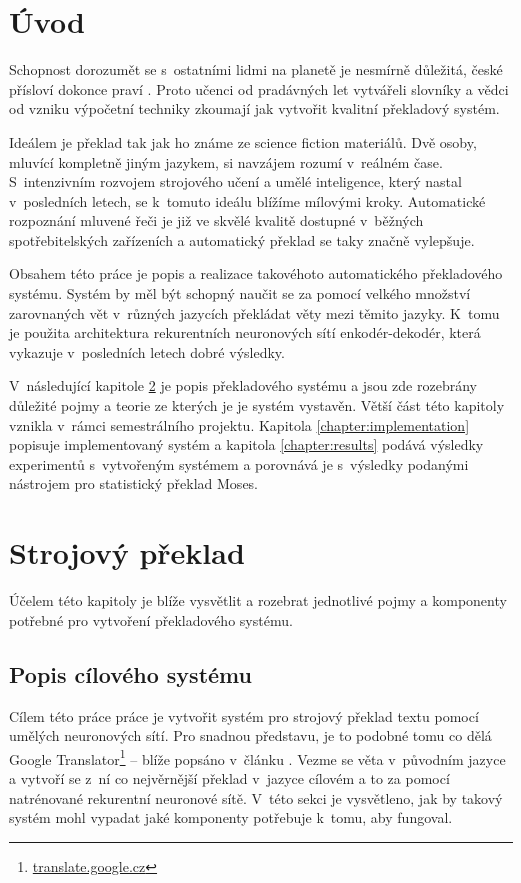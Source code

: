 \chapter{Úvod}
Schopnost dorozumět se s~ostatními lidmi na planetě je nesmírně důležitá, české přísloví dokonce praví . Proto učenci od pradávných let vytvářeli slovníky a vědci od vzniku výpočetní techniky zkoumají jak vytvořit kvalitní překladový systém.

Ideálem je překlad tak jak ho známe ze science fiction materiálů. Dvě osoby, mluvící kompletně jiným jazykem, si navzájem rozumí v~reálném čase. S~intenzivním rozvojem strojového učení a umělé inteligence, který nastal v~posledních letech, se k~tomuto ideálu blížíme mílovými kroky. Automatické rozpoznání mluvené řeči je již ve skvělé kvalitě dostupné v~běžných spotřebitelských zařízeních a automatický překlad se taky značně vylepšuje.

Obsahem této práce je popis a realizace takovéhoto automatického překladového systému. Systém by měl být schopný naučit se za pomocí velkého množství zarovnaných vět v~různých jazycích překládat věty mezi těmito jazyky. K~tomu je použita architektura rekurentních neuronových sítí enkodér-dekodér, která vykazuje v~posledních letech dobré výsledky.

V~následující kapitole \ref{chapter:theory} je popis překladového systému a jsou zde rozebrány důležité pojmy a teorie ze kterých je je systém vystavěn. Větší část této kapitoly vznikla v~rámci semestrálního projektu. Kapitola \ref{chapter:implementation} popisuje implementovaný systém a kapitola \ref{chapter:results} podává výsledky experimentů s~vytvořeným systémem a porovnává je s~výsledky podanými nástrojem pro statistický překlad Moses.


\chapter{Strojový překlad}\label{chapter:theory}
Účelem této kapitoly je blíže vysvětlit a rozebrat jednotlivé pojmy a komponenty potřebné pro vytvoření překladového systému.

\section{Popis cílového systému} \label{chapter:draft}
Cílem této práce práce je vytvořit systém pro strojový překlad textu pomocí umělých neuronových sítí. Pro snadnou představu, je to podobné tomu co dělá Google Translator\footnote{\url{translate.google.cz}} -- blíže popsáno v~článku \cite{googleBridgingGap}. Vezme se věta v~původním jazyce a vytvoří se z~ní co nejvěrnější překlad v~jazyce cílovém a to za pomocí natrénované rekurentní neuronové sítě. V~této sekci je vysvětleno, jak by takový systém mohl vypadat jaké komponenty potřebuje k~tomu, aby fungoval.

